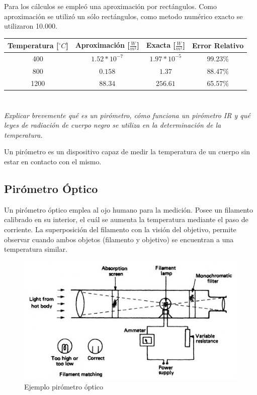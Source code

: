 \documentclass[10pt,a4paper]{article}
\begin{document}
		Para los cálculos se empleó una aproximación por rectángulos. Como aproximación se utilizó un sólo rectángulos,
		como metodo numérico exacto se utilizaron 10.000.

		\begin{center}
					
			{\footnotesize \begin{tabular}{ |c|c|c|c|}
		
			\hline
			Temperatura [$^{\circ}C$] & Aproximación [$\frac{W}{m^2}$]& Exacta [$\frac{W}{m^2}$] & Error Relativo \\ \hline
			400 \cellcolor{Gray} & $1.52 * 10^{-7}$ & $1.97 * 10^{-5}$ & 99.23\%\\ \hline
			800 \cellcolor{Gray} & $0.158$ & $1.37$ & 88.47\%\\ \hline
			1200 \cellcolor{Gray} & $88.34$ & $256.61$ & 65.57\%\\ \hline
			\end{tabular}}
		\end{center}

	\section{}\label{sec_d}
		\textit{
		Explicar brevemente qué es un pirómetro, cómo funciona un pirómetro IR y qué leyes de radiación de cuerpo negro se utiliza en la determinación de la temperatura.
		}

		Un pirómetro es un dispositivo capaz de medir la temperatura de un cuerpo sin estar en contacto con el mismo. 

		\subsection{Pirómetro Óptico}
			Un pirómetro óptico emplea al ojo humano para la medición. Posee un filamento calibrado en su interior, el cuál se aumenta la temperatura mediante el paso de corriente. La superposición del filamento con la visión del objetivo, permite observar cuando ambos objetos (filamento y objetivo) se encuentran a una temperatura similar.

			\begin{figure}[H]
				\centering\includegraphics[scale=.8]{images/optical-pyrometer.jpg}\caption{Ejemplo pirómetro óptico}
			\end{figure}
\end{document}
